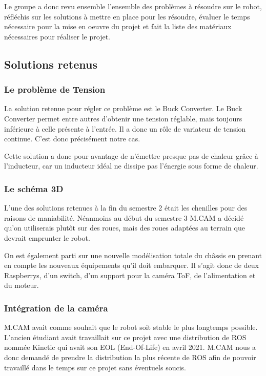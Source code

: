 Le groupe a donc revu ensemble l'ensemble des problèmes à résoudre sur le robot, réfléchis sur les solutions à mettre en place pour les résoudre, évaluer le temps nécessaire pour la mise en oeuvre du projet et fait la liste des matériaux nécessaires pour réaliser le projet.


\subsection{Solutions retenus}

\subsubsection{Le problème de Tension}

La solution retenue pour régler ce problème est le Buck Converter. Le Buck Converter permet entre autres d’obtenir une tension réglable, mais toujours inférieure à celle présente à l’entrée. Il a donc un rôle de variateur de tension continue. C’est donc précisément notre cas.

Cette solution a donc pour avantage de n’émettre presque pas de chaleur grâce à l’inducteur, car un inducteur idéal ne dissipe pas l’énergie sous forme de chaleur.

\subsubsection{Le schéma 3D}

L’une des solutions retenues à la fin du semestre 2  était les chenilles pour des raisons de maniabilité. 
Néanmoins au début du semestre 3 M.CAM a décidé qu’on utiliserais plutôt sur des roues, mais des roues adaptées au terrain que devrait emprunter le robot.

On est également parti sur une nouvelle modélisation totale du châssis en prenant en compte les nouveaux équipements qu’il doit embarquer. Il s’agit donc de deux Raspberrys, d’un switch, d’un support pour la caméra ToF, de l’alimentation et du moteur.

\subsubsection{Intégration de la caméra}

M.CAM avait comme souhait que le robot soit stable le plus longtemps possible. L'ancien étudiant avait travaillait sur ce projet avec une distribution de ROS nommée Kinetic qui avait son EOL (End-Of-Life) en avril 2021. M.CAM nous a donc demandé de prendre la distribution la plus récente de ROS afin de pouvoir travaillé dans le temps sur ce projet sans éventuels soucis.

